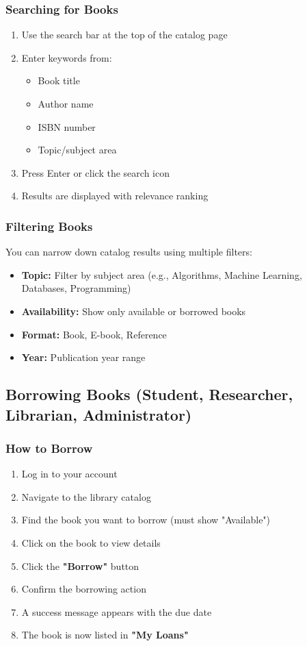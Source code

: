 \documentclass[12pt,a4paper]{article}
\begin{document}
\subsubsection{Searching for Books}
\begin{enumerate}[leftmargin=*]
    \item Use the search bar at the top of the catalog page
    \item Enter keywords from:
        \begin{itemize}
            \item Book title
            \item Author name
            \item ISBN number
            \item Topic/subject area
        \end{itemize}
    \item Press Enter or click the search icon
    \item Results are displayed with relevance ranking
\end{enumerate}

\subsubsection{Filtering Books}
You can narrow down catalog results using multiple filters:
\begin{itemize}[leftmargin=*]
    \item \textbf{Topic:} Filter by subject area (e.g., Algorithms, Machine Learning, Databases, Programming)
    \item \textbf{Availability:} Show only available or borrowed books
    \item \textbf{Format:} Book, E-book, Reference
    \item \textbf{Year:} Publication year range
\end{itemize}

\subsection{Borrowing Books (Student, Researcher, Librarian, Administrator)}

\subsubsection{How to Borrow}
\begin{enumerate}[leftmargin=*]
    \item Log in to your account
    \item Navigate to the library catalog
    \item Find the book you want to borrow (must show "Available")
    \item Click on the book to view details
    \item Click the \textbf{"Borrow"} button
    \item Confirm the borrowing action
    \item A success message appears with the due date
    \item The book is now listed in \textbf{"My Loans"}
\end{enumerate}
\end{document}
